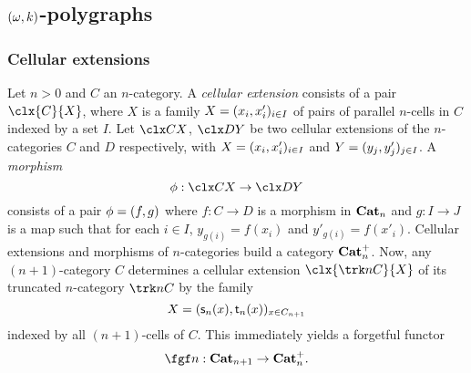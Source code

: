  \subsection{$(\omega,k)$-polygraphs}\label{subsec:okpol}
 \subsubsection{Cellular extensions}\label{ssubsec:cellext}
 Let $n>0$ and $C$ an $n$-category. A {\em cellular extension} consists of a pair $\clx{C}{X}$, where $X$ is a  family $X=(x_i,x'_i)_{i\in I}$ of pairs of parallel $n$-cells in $C$ indexed by a set $I$. Let $\clx CX$, $\clx DY$ be two cellular extensions of the $n$-categories $C$ and $D$ respectively, with $X=(x_i,x'_i)_{i\in I}$ and $Y=(y_j,y'_j)_{j\in I}$. A {\em morphism}
 \[\phi:\clx CX\to\clx DY\]
 consists of a pair $\phi=(f,g)$ where $f:C\to D$ is a morphism in $\mathbf{Cat}_{n}$ and $g:I\to J$ is a map such that for each $i\in I$, $y_{g(i)}=f(x_i)$ and $y'_{g(i)}=f(x'_i)$. Cellular extensions and morphisms of $n$-categories build a category $\mathbf{Cat}_{n}^{+}$. Now, any $(n{+}1)$-category $C$ determines a cellular extension $\clx{\trk n C}{X}$ of its truncated $n$-category $\trk n C$ by the family
 \[X=(\mathsf{s}_{n}(x),\mathsf{t}_{n}(x))_{x\in C_{n+1}}\]
 indexed by all $(n{+}1)$-cells of $C$. This immediately yields a forgetful functor
 \[\fgf n:\nCat {n+1}\to \nCatp n.\]
 
 
